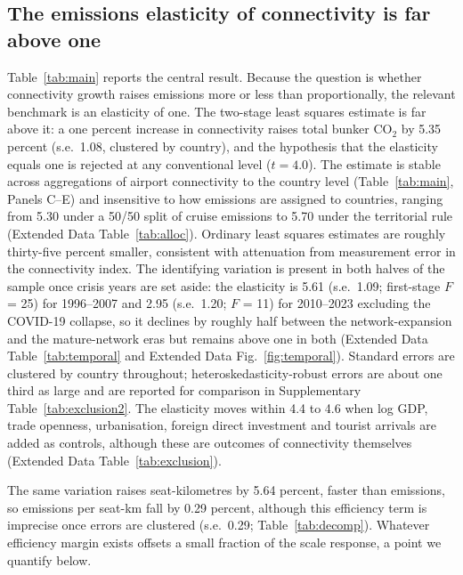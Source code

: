 \documentclass[12pt]{article}
\begin{document}
\subsection*{The emissions elasticity of connectivity is far above one}
Table~\ref{tab:main} reports the central result. Because the question is
whether connectivity growth raises emissions more or less than
proportionally, the relevant benchmark is an elasticity of one. The
two-stage least squares estimate is far above it: a one percent increase in
connectivity raises total bunker CO$_2$ by 5.35 percent (s.e.\ 1.08,
clustered by country), and the hypothesis that the elasticity equals one
is rejected at any conventional level ($t = 4.0$). The estimate is stable across aggregations of airport connectivity
to the country level (Table~\ref{tab:main}, Panels C--E) and insensitive
to how emissions are assigned to countries, ranging from 5.30 under a 50/50
split of cruise emissions to 5.70 under the territorial rule (Extended Data
Table~\ref{tab:alloc}). Ordinary least squares estimates are
roughly thirty-five percent smaller, consistent with attenuation from measurement
error in the connectivity index. The identifying variation is present in
both halves of the sample once crisis years are set aside: the elasticity
is 5.61 (s.e.\ 1.09; first-stage $F$ = 25) for 1996--2007 and 2.95 (s.e.\
1.20; $F$ = 11) for 2010--2023 excluding the COVID-19 collapse, so it
declines by roughly half between the network-expansion and the
mature-network eras but remains above one in both (Extended Data
Table~\ref{tab:temporal} and Extended Data Fig.~\ref{fig:temporal}).
Standard errors are clustered by country throughout; heteroskedasticity-robust
errors are about one third as large and are reported for comparison in
Supplementary Table~\ref{tab:exclusion2}. The elasticity moves within 4.4
to 4.6 when log GDP, trade openness, urbanisation, foreign direct
investment and tourist arrivals are added as controls, although these are
outcomes of connectivity themselves (Extended Data
Table~\ref{tab:exclusion}).

The same variation raises seat-kilometres by 5.64 percent, faster than
emissions, so emissions per seat-km fall by 0.29 percent, although this
efficiency term is imprecise once errors are clustered (s.e.\ 0.29;
Table~\ref{tab:decomp}). Whatever efficiency margin exists offsets
a small fraction of the scale response, a point we quantify below.
\end{document}
